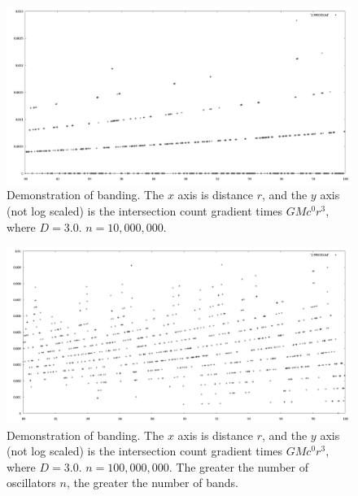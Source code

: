 \documentclass[12pt]{article}
\begin{document}
\pagebreak



\begin{figure} 
\centering
  \includegraphics[width = 6 in]{10000000.png}
  \caption{
Demonstration of banding.
The $x$ axis is distance $r$, and the $y$ axis (not log scaled) is the intersection count gradient times $GM c^0 r^3$, where $D = 3.0$. $n = 10,000,000$.
}
\end{figure}


\begin{figure} 
\centering
  \includegraphics[width = 6 in]{100000000.png}
  \caption{
Demonstration of banding.
The $x$ axis is distance $r$, and the $y$ axis (not log scaled) is the intersection count gradient times $GM c^0 r^3$, where $D = 3.0$. $n = 100,000,000$.
The greater the number of oscillators $n$, the greater the number of bands.
}
\end{figure}
\end{document}
